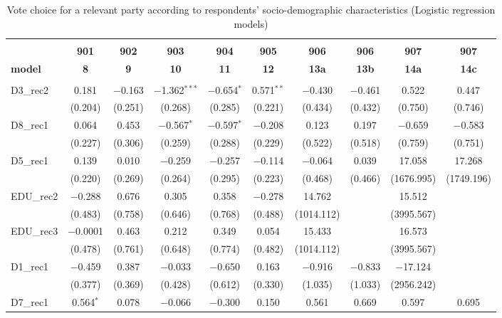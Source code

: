 \documentclass[
]{article}
\begin{document}
\begin{table}[!htbp] \centering 
  \caption{Vote choice for a relevant party according to respondents' 
                       socio-demographic characteristics (Logistic regression models)} 
  \label{table:full_logit_ee} 
\begin{tabular}{@{\extracolsep{5pt}}lccccccccc} 
\\[-1.8ex]\hline \\[-1.8ex] 
 & \textbf{901} & \textbf{902} & \textbf{903} & \textbf{904} & \textbf{905} & \textbf{906} & \textbf{906} & \textbf{907} & \textbf{907} \\ 
\textbf{model} & \textbf{8} & \textbf{9} & \textbf{10} & \textbf{11} & \textbf{12} & \textbf{13a} & \textbf{13b} & \textbf{14a} & \textbf{14c}\\ 
\hline \\[-1.8ex] 
 D3\_rec2 & 0.181 & $-$0.163 & $-$1.362$^{***}$ & $-$0.654$^{*}$ & 0.571$^{**}$ & $-$0.430 & $-$0.461 & 0.522 & 0.447 \\ 
  & (0.204) & (0.251) & (0.268) & (0.285) & (0.221) & (0.434) & (0.432) & (0.750) & (0.746) \\ 
  D8\_rec1 & 0.064 & 0.453 & $-$0.567$^{*}$ & $-$0.597$^{*}$ & $-$0.208 & 0.123 & 0.197 & $-$0.659 & $-$0.583 \\ 
  & (0.227) & (0.306) & (0.259) & (0.288) & (0.229) & (0.522) & (0.518) & (0.759) & (0.751) \\ 
  D5\_rec1 & 0.139 & 0.010 & $-$0.259 & $-$0.257 & $-$0.114 & $-$0.064 & 0.039 & 17.058 & 17.268 \\ 
  & (0.220) & (0.269) & (0.264) & (0.295) & (0.223) & (0.468) & (0.466) & (1676.995) & (1749.196) \\ 
  EDU\_rec2 & $-$0.288 & 0.676 & 0.305 & 0.358 & $-$0.278 & 14.762 &  & 15.512 &  \\ 
  & (0.483) & (0.758) & (0.646) & (0.768) & (0.488) & (1014.112) &  & (3995.567) &  \\ 
  EDU\_rec3 & $-$0.0001 & 0.463 & 0.212 & 0.349 & 0.054 & 15.433 &  & 16.573 &  \\ 
  & (0.478) & (0.761) & (0.648) & (0.774) & (0.482) & (1014.112) &  & (3995.567) &  \\ 
  D1\_rec1 & $-$0.459 & 0.387 & $-$0.033 & $-$0.650 & 0.163 & $-$0.916 & $-$0.833 & $-$17.124 &  \\ 
  & (0.377) & (0.369) & (0.428) & (0.612) & (0.330) & (1.035) & (1.033) & (2956.242) &  \\ 
  D7\_rec1 & 0.564$^{*}$ & 0.078 & $-$0.066 & $-$0.300 & 0.150 & 0.561 & 0.669 & 0.597 & 0.695 \\ 

\end{tabular}
\end{table}
\end{document}

